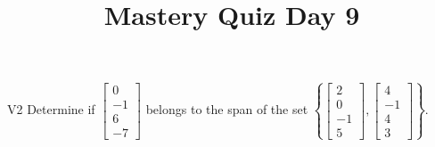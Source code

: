 \documentclass{sbgLAquiz}
\title{Mastery Quiz Day 9 }
\begin{document}
\begin{problem}{V2}
  Determine if
  \(\begin{bmatrix} 0 \\ -1 \\ 6 \\ -7 \end{bmatrix}\)
  belongs to the span of the set
  \(\left\{
    \begin{bmatrix} 2 \\ 0 \\ -1 \\ 5 \end{bmatrix},
    \begin{bmatrix} 4 \\ -1 \\ 4 \\ 3 \end{bmatrix}
    \right\}
  \).
\end{problem}
\end{document}
